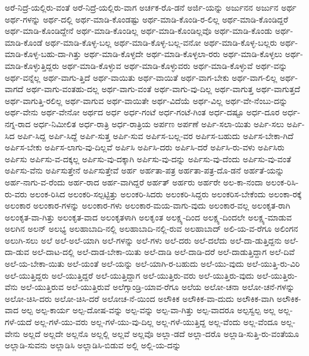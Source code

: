 {ಅರೆ-ನಿದ್ರೆ-ಯಲ್ಲಿರು-ವಂತೆ
ಅರೆ-ನಿದ್ರೆ-ಯಲ್ಲಿರು-ವಾಗ
ಅರ್ಚಕ-ರೊ-ಡನೆ
ಅರ್ಜಿ-ಯನ್ನು
ಅರ್ಜುನನ
ಅರ್ಜುನ
ಅರ್ಥ
ಅರ್ಥ-ಗಳನ್ನು
ಅರ್ಥ-ದಲ್ಲಿ
ಅರ್ಥ-ಮಾಡಿ-ಕೊಂಡಷ್ಟು
ಅರ್ಥ-ಮಾಡಿ-ಕೊಂಡಿ-ರ-ಲಿಲ್ಲ
ಅರ್ಥ-ಮಾಡಿ-ಕೊಂಡಿದ್ದರೆ
ಅರ್ಥ-ಮಾಡಿ-ಕೊಂಡಿದ್ದೇನೆ
ಅರ್ಥ-ಮಾಡಿ-ಕೊಂಡಿಲ್ಲ
ಅರ್ಥ-ಮಾಡಿ-ಕೊಂಡಿಲ್ಲವೊ
ಅರ್ಥ-ಮಾಡಿ-ಕೊಂಡು
ಅರ್ಥ-ಮಾಡಿ-ಕೊಂಡೆ
ಅರ್ಥ-ಮಾಡಿ-ಕೊಳ್ಳ-ಬಲ್ಲ
ಅರ್ಥ-ಮಾಡಿ-ಕೊಳ್ಳ-ಬಲ್ಲ-ವನೋ
ಅರ್ಥ-ಮಾಡಿ-ಕೊಳ್ಳ-ಬಲ್ಲರು
ಅರ್ಥ-ಮಾಡಿ-ಕೊಳ್ಳ-ಬಹು-ದಾ-ಗಿತ್ತು
ಅರ್ಥ-ಮಾಡಿ-ಕೊಳ್ಳದೇ
ಅರ್ಥ-ಮಾಡಿ-ಕೊಳ್ಳಲಾ-ರರು
ಅರ್ಥ-ಮಾಡಿ-ಕೊಳ್ಳಲು
ಅರ್ಥ-ಮಾಡಿ-ಕೊಳ್ಳುತ್ತಿದ್ದರು
ಅರ್ಥ-ಮಾಡಿ-ಕೊಳ್ಳುವ
ಅರ್ಥ-ಮಾಡಿ-ಕೊಳ್ಳುವರು
ಅರ್ಥ-ಮಾಡಿ-ಕೊಳ್ಳುವೆ
ಅರ್ಥ-ವನ್ನು
ಅರ್ಥ-ವನ್ನೆಲ್ಲ
ಅರ್ಥ-ವಾಗು-ತ್ತಿದೆ
ಅರ್ಥ-ವಾಯಿತು
ಅರ್ಥ-ವಾಯಿತೆ
ಅರ್ಥ-ವಾಗ-ಬೇಕು
ಅರ್ಥ-ವಾಗ-ಲಿಲ್ಲ
ಅರ್ಥ-ವಾಗದೆ
ಅರ್ಥ-ವಾಗು-ವಂತಹು-ದಲ್ಲ
ಅರ್ಥ-ವಾಗು-ವಂತೆ
ಅರ್ಥ-ವಾಗು-ವು-ದಿಲ್ಲ
ಅರ್ಥ-ವಾಗುತ್ತ
ಅರ್ಥ-ವಾಗುತ್ತದೆ
ಅರ್ಥ-ವಾಗುತ್ತಿ-ರಲಿಲ್ಲ
ಅರ್ಥ-ವಾಗುವ
ಅರ್ಥ-ವಾಯಿತೇ
ಅರ್ಥ-ವಿದೆಯೆ
ಅರ್ಥ-ವಿಲ್ಲ
ಅರ್ಥ-ವೇ-ನೆಂಬು-ದನ್ನು
ಅರ್ಥ-ವೇನು
ಅರ್ಥ-ವೇನೋ
ಅರ್ಥದ
ಅರ್ಧ
ಅರ್ಧ-ಗಂಟೆ
ಅರ್ಧ-ಗಂಟೆ-ಗಿಂತ
ಅರ್ಧ-ದಷ್ಟೂ
ಅರ್ಧ-ದೂರ
ಅರ್ಧ-ನಗ್ನ-ರಾದ
ಅರ್ಧ-ನಿಮೀಲಿತ
ಅರ್ಧ-ರಾತ್ರಿ
ಅರ್ಧ-ರಾತ್ರಿಯ
ಅರ್ಪಣ
ಅರ್ಪಣೆ
ಅರ್ಪಿ-ಸಲಾ-ಯಿತು
ಅರ್ಪಿ-ಸಲು
ಅರ್ಪಿ-ಸಿದ
ಅರ್ಪಿ-ಸಿದ್ದ
ಅರ್ಪಿ-ಸಿದ್ದೆ
ಅರ್ಪಿ-ಸುತ್ತ
ಅರ್ಪಿ-ಸುವ
ಅರ್ಪಿಸ-ಬಲ್ಲ-ವರ
ಅರ್ಪಿಸ-ಬಹುದು
ಅರ್ಪಿಸ-ಬೇಕಾ-ಗಿದೆ
ಅರ್ಪಿಸ-ಬೇಕು
ಅರ್ಪಿಸ-ಲಾಗು-ವು-ದಿಲ್ಲವೆ
ಅರ್ಪಿಸಿ
ಅರ್ಪಿಸಿ-ದರು
ಅರ್ಪಿಸಿ-ದರೆ
ಅರ್ಪಿಸಿ-ರು-ವಳು
ಅರ್ಪಿಸಿರು
ಅರ್ಪಿಸು
ಅರ್ಪಿಸು-ವ-ದಕ್ಕಲ್ಲ
ಅರ್ಪಿಸು-ವು-ದಕ್ಕಾಗಿ
ಅರ್ಪಿಸು-ವು-ದನ್ನು
ಅರ್ಪಿಸು-ವು-ದೆಂದು
ಅರ್ಪಿಸು-ವು-ವಂತೆ
ಅರ್ಪಿಸು-ವೆನು
ಅರ್ಪಿಸುತ್ತೇನೆ
ಅರ್ಪಿಸುತ್ತೇವೆ
ಅರ್ಹ
ಅರ್ಹತಾ-ಪತ್ರ
ಅರ್ಹತಾ-ಪತ್ರ-ದೊ-ಡನೆ
ಅರ್ಹತೆ-ಯನ್ನು
ಅರ್ಹ-ನಾಗು-ವ-ರೆಂದು
ಅರ್ಹ-ರಾದ
ಅರ್ಹ-ವಾಗಿದ್ದರೆ
ಅರ್ಹತ್
ಅರ್ಹರು
ಅರ್ಹರೇ
ಅಲ-ಕಾ-ನಂದಾ
ಅಲಂಕ-ರಿಸಿ-ರು-ವರು
ಅಲಂಕ-ರಿಸಿದ
ಅಲಂಕರಿ-ಸಲ್ಪಟ್ಟಿತ್ತು
ಅಲಂಕರಿ-ಸಿದರು
ಅಲಂಕರಿ-ಸಿದ್ದರು
ಅಲಂಕರಿಸ-ಬೇಕೆಂದು
ಅಲಂಕಾ-ರಕ್ಕೆ
ಅಲಂಕಾರ
ಅಲಂಕಾರ-ಗಳನ್ನು
ಅಲಂಕಾರ-ಗಳು
ಅಲಂಕಾರ-ಮಯ-ವಾಗು-ವುದು
ಅಲಂಕಾರ-ವಲ್ಲ
ಅಲಂಕೃತ-ರಾಗಿ
ಅಲಂಕೃತ-ವಾ-ಗಿತ್ತು
ಅಲಂಕೃತ-ವಾದ
ಅಲಂಕೃತಳಾಗಿ
ಅಲಕೃಂತ
ಅಲಕ್ಷ್ಯ-ದಿಂದ
ಅಲಕ್ಷ್ಯ-ದಿಂದಲೇ
ಅಲಕ್ಷ್ಯ-ಮಾಡುವ
ಅಲಗಿನ
ಅಲನ್
ಅಲಭ್ಯ
ಅಲಹಾಬಾದಿ-ನಲ್ಲಿ
ಅಲಹಾಬಾದಿ-ನಲ್ಲಿ-ರುವ
ಅಲಹಾಬಾದ್
ಅಲಿ-ಯ-ವ-ರೆಗೂ
ಅಲಿಂಗನ
ಅಲುಗಿ-ಸಲು
ಅಲೆ
ಅಲೆ-ಅಲೆ-ಯಾಗಿ
ಅಲೆ-ಗಳನ್ನು
ಅಲೆ-ಗಳು
ಅಲೆ-ದರು
ಅಲೆ-ದಲೆದು
ಅಲೆ-ದಾ-ಡುತ್ತಿದ್ದನು
ಅಲೆ-ದಾ-ಡುವ
ಅಲೆ-ದಾಟ-ದಲ್ಲಿ
ಅಲೆ-ದಾಡ-ಬೇಕಾ-ಯಿತು
ಅಲೆ-ದಾಡಿ
ಅಲೆ-ದಾಡಿ-ದರೆ
ಅಲೆ-ದಾಡುತ್ತಿದ್ದಾಗ
ಅಲೆ-ದಿವೆ
ಅಲೆ-ಯ-ಬೇಕಾ-ಯಿತು
ಅಲೆ-ಯಂತೆ
ಅಲೆ-ಯನ್ನು
ಅಲೆ-ಯಾಗಿ-ರ-ಬಹುದು
ಅಲೆ-ಯು-ವುದು
ಅಲೆ-ಯುತ್ತಿ-ರು-ವಿರಿ
ಅಲೆ-ಯುತ್ತಿದ್ದರು
ಅಲೆ-ಯುತ್ತಿದ್ದರೆ
ಅಲೆ-ಯುತ್ತಿದ್ದಾಗ
ಅಲೆ-ಯುತ್ತಿರು-ವರು
ಅಲೆ-ಯುತ್ತಿರು-ವುದು
ಅಲೆ-ಯುತ್ತಿರು-ವೆನು
ಅಲೆ-ಯುತ್ತಿರುವ
ಅಲೆ-ಯುತ್ತಿರುವೆ
ಅಲೆಗ್ಸಾಂಡ್ರಿ-ಯಾವ-ರೆಗೂ
ಅಲೆಯ
ಅಲೋ-ಚನಾ
ಅಲೋ-ಚನೆ-ಗಳನ್ನು
ಅಲೋ-ಚಿಸಿ-ದರು
ಅಲೋ-ಚಿಸಿ-ದರೆ
ಅಲೋಚ-ನೆ-ಯಿಂದ
ಅಲೌಕಿಕ
ಅಲೌಕಿಕ-ವಾ-ದುದು
ಅಲೌಕಿಕ-ವಾಗಿ
ಅಲೌಕಿಕ-ವಾದ
ಅಲ್ಪ
ಅಲ್ಪ-ಕಾರ್ಯ
ಅಲ್ಪ-ದೋಷ-ವನ್ನು
ಅಲ್ಪ-ವನ್ನು
ಅಲ್ಪ-ವಾ-ಗಿತ್ತು
ಅಲ್ಪ-ವಾದರೂ
ಅಲ್ಪಸ್ವಲ್ಪ
ಅಲ್ಲ
ಅಲ್ಲ-ಗಳೆ-ಯದೆ
ಅಲ್ಲ-ಗಳೆ-ಯು-ವರು
ಅಲ್ಲ-ಗಳೆ-ಯು-ವು-ದಿಲ್ಲ
ಅಲ್ಲ-ಗಳೆ-ಯುತ್ತಿದ್ದ
ಅಲ್ಲ-ವೆಂದು
ಅಲ್ಲ-ವೆಂದೂ
ಅಲ್ಲ-ವೇನು
ಅಲ್ಲದೆ
ಅಲ್ಲದೇ
ಅಲ್ಲನೊ
ಅಲ್ಲಲ್ಲಿ
ಅಲ್ಲವೆ
ಅಲ್ಲವೊ
ಅಲ್ಲಾ-ಡದೆ
ಅಲ್ಲಾ-ದರೊ
ಅಲ್ಲಾಡಿ-ಸುತ್ತಿ-ರು-ವಂತೆಯೂ
ಅಲ್ಲಾಡಿ-ಸುವನು
ಅಲ್ಲಾಡಿಸಿ
ಅಲ್ಲಾಡಿಸಿ-ಬಿಡುವ
ಅಲ್ಲಿ
ಅಲ್ಲಿ-ಯ-ದನ್ನು
}
